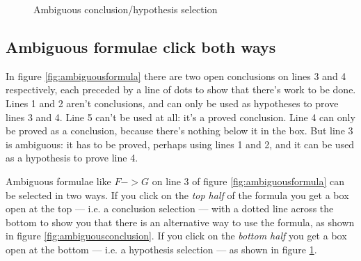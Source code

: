 \documentclass[11pt]{book}
\newcommand{\figref}[1]{figure \ref{fig:#1}}
\begin{document}
\begin{figure}
{  \label{fig:ambiguoushypothesis}
  \parbox[b]{130pt}{\centering{}}}
\caption{Ambiguous conclusion/hypothesis selection}
\end{figure}

\subsection{Ambiguous formulae click both ways}

In \figref{ambiguousformula} there are two open conclusions on lines 3 and 4 respectively, each preceded by a line of dots to show that there's work to be done. Lines 1 and 2 aren't conclusions, and can only be used as hypotheses to prove lines 3 and 4. Line 5 can't be used at all: it's a proved conclusion. Line 4 can only be proved as a conclusion, because there's nothing below it in the box. But line 3 is ambiguous: it has to be proved, perhaps using lines 1 and 2, and it can be used as a hypothesis to prove line 4. 

Ambiguous formulae like $F->G$ on line 3 of \figref{ambiguousformula} can be selected in two ways. If you click on the \emph{top half} of the formula you get a box open at the top --- i.e. a conclusion selection --- with a dotted line across the bottom to show you that there is an alternative way to use the formula, as shown in \figref{ambiguousconclusion}. If you click on the \emph{bottom half} you get a box open at the bottom --- i.e. a hypothesis selection --- as shown in \figref{ambiguoushypothesis}.
\end{document}
